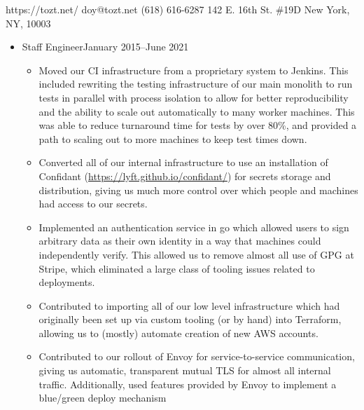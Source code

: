 \documentclass[letterpaper]{article}
\begin{document}
          {https://tozt.net/}
          {doy@tozt.net\hspace{0.5in}}
          {(618) 616-6287}
          {142 E. 16th St. \#19D}
          {New York, NY, 10003}
\begin{itemize}
    \item {}
                        {Staff Engineer}{January 2015--June 2021}
        \begin{itemize}
            \item Moved our CI infrastructure from a proprietary system to
                Jenkins. This included rewriting the testing infrastructure of
                our main monolith to run tests in parallel with process
                isolation to allow for better reproducibility and the ability
                to scale out automatically to many worker machines. This was
                able to reduce turnaround time for tests by over 80\%, and
                provided a path to scaling out to more machines to keep test
                times down.
            \item Converted all of our internal infrastructure to use an
                installation of Confidant
                (\url{https://lyft.github.io/confidant/}) for secrets storage
                and distribution, giving us much more control over which
                people and machines had access to our secrets.
            \item Implemented an authentication service in go which allowed
                users to sign arbitrary data as their own identity in a way
                that machines could independently verify. This allowed us to
                remove almost all use of GPG at Stripe, which eliminated a
                large class of tooling issues related to deployments.
            \item Contributed to importing all of our low level infrastructure
                which had originally been set up via custom tooling (or by
                hand) into Terraform, allowing us to (mostly) automate
                creation of new AWS accounts.
            \item Contributed to our rollout of Envoy for service-to-service
                communication, giving us automatic, transparent mutual TLS for
                almost all internal traffic. Additionally, used features
                provided by Envoy to implement a blue/green deploy mechanism

\end{itemize}
\end{itemize}
\end{document}
